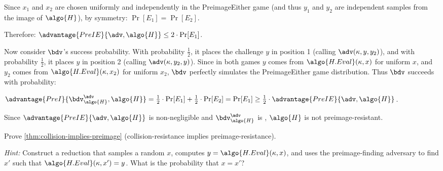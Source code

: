 \begin{mysolution}
  Since $x_1$ and $x_2$ are chosen uniformly and independently in the PreimageEither game (and thus $y_1$ and $y_2$ are independent samples from the image of $\algo{H}$), by symmetry: $\Pr[E_1] = \Pr[E_2]$.
  
  Therefore: $\advantage{PreIE}{\adv, \algo{H}} \leq 2 \cdot \Pr[E_1]$.
  
  Now consider $\bdv$'s success probability. With probability $\frac{1}{2}$, it places the challenge $y$ in position 1 (calling $\adv(\kappa, y, y_2)$), and with probability $\frac{1}{2}$, it places $y$ in position 2 (calling $\adv(\kappa, y_2, y)$).
  Since in both games $y$ comes from $\algo{H.Eval}(\kappa, x)$ for uniform $x$, and $y_2$ comes from $\algo{H.Eval}(\kappa, x_2)$ for uniform $x_2$, $\bdv$ perfectly simulates the PreimageEither game distribution. Thus $\bdv$ succeeds with probability:
  
  $\advantage{PreI}{\bdv^\adv_\algo{H}, \algo{H}} = \frac{1}{2} \cdot \Pr[E_1] + \frac{1}{2} \cdot \Pr[E_2] = \Pr[E_1] \geq \frac{1}{2} \cdot \advantage{PreIE}{\adv, \algo{H}}$.
  
  Since $\advantage{PreIE}{\adv, \algo{H}}$ is non-negligible and $\bdv^\adv_\algo{H}$ is \ppt, $\algo{H}$ is not preimage-resistant.
\end{mysolution}
\fi

\begin{exercise}\label{ex:collision-implies-preimage}
  Prove \autoref{thm:collision-implies-preimage} (collision-resistance implies preimage-resistance).
  
  \emph{Hint:} Construct a reduction that samples a random $x$, computes $y = \algo{H.Eval}(\kappa, x)$, and uses the preimage-finding adversary to find $x'$ such that $\algo{H.Eval}(\kappa, x') = y$. What is the probability that $x = x'$?
\end{exercise}

